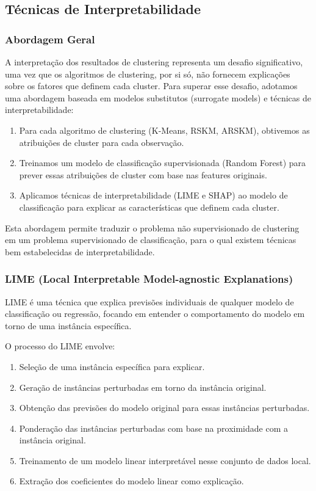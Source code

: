 \documentclass[conference]{IEEEtran}
\begin{document}
\subsection{Técnicas de Interpretabilidade}
\subsubsection{Abordagem Geral}
A interpretação dos resultados de clustering representa um desafio significativo, uma vez que os algoritmos de clustering, por si só, não fornecem explicações sobre os fatores que definem cada cluster. Para superar esse desafio, adotamos uma abordagem baseada em modelos substitutos (surrogate models) e técnicas de interpretabilidade:

\begin{enumerate}
    \item Para cada algoritmo de clustering (K-Means, RSKM, ARSKM), obtivemos as atribuições de cluster para cada observação.
    \item Treinamos um modelo de classificação supervisionada (Random Forest) para prever essas atribuições de cluster com base nas features originais.
    \item Aplicamos técnicas de interpretabilidade (LIME e SHAP) ao modelo de classificação para explicar as características que definem cada cluster.
\end{enumerate}

Esta abordagem permite traduzir o problema não supervisionado de clustering em um problema supervisionado de classificação, para o qual existem técnicas bem estabelecidas de interpretabilidade.

\subsubsection{LIME (Local Interpretable Model-agnostic Explanations)}
LIME \cite{ribeiro2016should} é uma técnica que explica previsões individuais de qualquer modelo de classificação ou regressão, focando em entender o comportamento do modelo em torno de uma instância específica.

O processo do LIME envolve:

\begin{enumerate}
    \item Seleção de uma instância específica para explicar.
    \item Geração de instâncias perturbadas em torno da instância original.
    \item Obtenção das previsões do modelo original para essas instâncias perturbadas.
    \item Ponderação das instâncias perturbadas com base na proximidade com a instância original.
    \item Treinamento de um modelo linear interpretável nesse conjunto de dados local.
    \item Extração dos coeficientes do modelo linear como explicação.
\end{enumerate}
\end{document}
